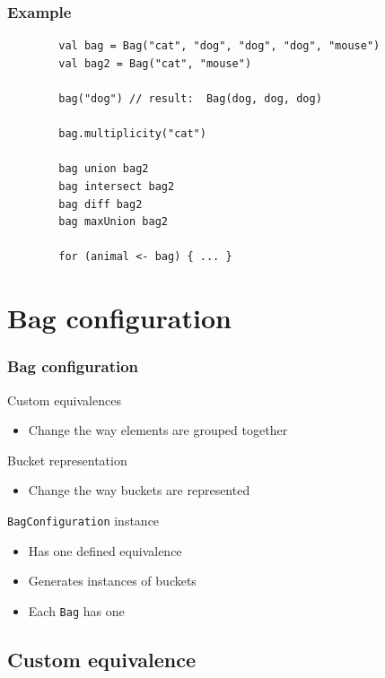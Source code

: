 \documentclass{beamer}
\begin{document}
\begin{frame}[fragile]
	\frametitle{Example}
	\begin{lstlisting}
		val bag = Bag("cat", "dog", "dog", "dog", "mouse")
		val bag2 = Bag("cat", "mouse")

		bag("dog") // result:  Bag(dog, dog, dog)
		
		bag.multiplicity("cat")
		
		bag union bag2
		bag intersect bag2
		bag diff bag2
		bag maxUnion bag2
		
		for (animal <- bag) { ... }
	\end{lstlisting}
\end{frame}


\section{Bag configuration} 
\begin{frame}[fragile]
	\frametitle{Bag configuration}
	\begin{block}{Custom equivalences}
		\begin{itemize}
			\item Change the way elements are grouped together
		\end{itemize}
	\end{block}
	\begin{block}{Bucket representation}
		\begin{itemize}
			\item Change the way buckets are represented
		\end{itemize}
	\end{block}
	\begin{block}{\texttt{BagConfiguration} instance}
		\begin{itemize}
			\item Has one defined equivalence
			\item Generates instances of buckets
			\item Each \texttt{Bag} has one
		\end{itemize}
	\end{block}
\end{frame}

\subsection{Custom equivalence} 
\end{document}
